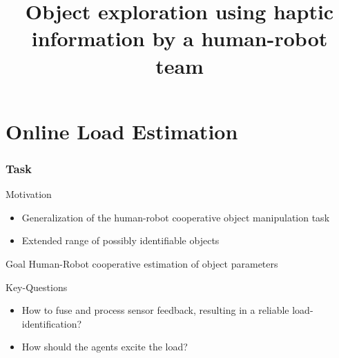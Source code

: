 \documentclass[student,noshadow]{ITRslides}
\title{Object exploration using haptic information by a human-robot team}
\begin{document}
\begin{frame}
	\titlepage
\end{frame}


\section{Online Load Estimation}

\begin{frame}
	\frametitle{Task}
	
	\begin{block}{Motivation}
		\begin{itemize}
			\item Generalization of the human-robot cooperative object manipulation task
			\item Extended range of possibly identifiable objects
		\end{itemize}
	\end{block}
	
	\begin{block}{Goal}
		Human-Robot cooperative estimation of object parameters
	\end{block}
	\vspace{2mm}
	\begin{block}{Key-Questions}
		\begin{itemize}
			\item How to fuse and process sensor feedback, resulting in a reliable load-identification?
			\item How should the agents excite the load?
		\end{itemize}	   
	\end{block}	
\end{frame}
\end{document}
